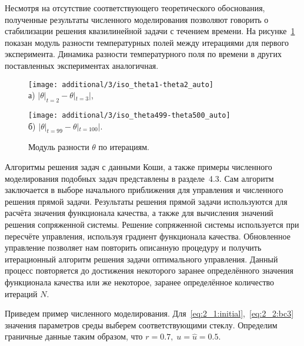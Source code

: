 Несмотря на отсутствие соответствующего теоретического обоснования,
полученные результаты численного моделирования
позволяют говорить о стабилизации решения квазилинейной задачи с течением времени.
На рисунке~\ref{fig:4_3:time_diff} показан модуль разности температурных полей
между итерациями для первого эксперимента.
Динамика разности температурного поля по времени в других поставленных экспериментах аналогичная.
\begin{figure}[h!t]
    \begin{minipage}[b][][b]{0.49\linewidth}
        \centering
        \texttt{[image: additional/3/iso\_theta1-theta2\_auto]} \\ а) $|\theta|_{t=2} - \theta|_{t=3}|$,
    \end{minipage}
    \hfill
    \begin{minipage}[b][][b]{0.49\linewidth}
        \centering
        \texttt{[image: additional/3/iso\_theta499-theta500\_auto]} \\ б) $|\theta|_{t=99} - \theta|_{t=100}|$.
    \end{minipage}
    \caption{Модуль разности $\theta$ по итерациям.}
    \label{fig:4_3:time_diff}
\end{figure}


Алгоритмы решения задач с данными Коши, а также примеры численного
моделирования подобных задач представлены в разделе~4.3.
Сам алгоритм заключается в выборе начального приближения
для управления и численного решения прямой задачи.
Результаты решения прямой задачи используются для расчёта значения функционала качества,
а также для вычисления значений решения сопряженной системы.
Решение сопряженной системы используется при пересчёте управления,
используя градиент функционала качества.
Обновленное управление позволяет нам повторить описанную процедуру и получить итерационный
алгоритм решения задачи оптимального управления.
Данный процесс повторяется до достижения некоторого заранее определённого значения функционала
качества или же некоторое, заранее определённое количество итераций $N$.


Приведем пример численного моделирования.
Для~\eqref{eq:2_1:initial},~\eqref{eq:2_2:bc3} значения параметров
среды выберем соответствующими стеклу.
Определим граничные данные таким образом, что $r = 0.7,\; u = \hat u = 0.5$.

